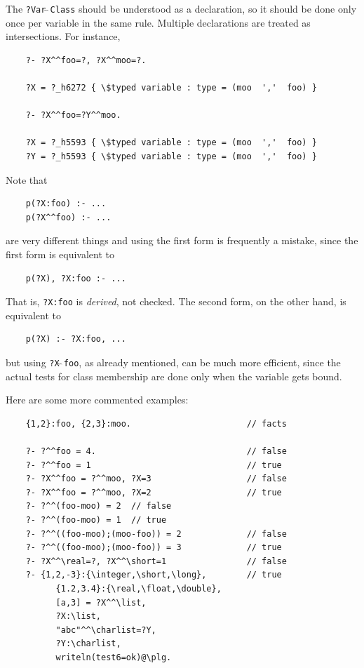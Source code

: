 \documentclass[11pt]{article}
\begin{document}
The \texttt{?Var$\hat{~}\hat{~}$Class} should be understood as a declaration,
so it should be done only once per variable in the same rule.
Multiple declarations are treated as intersections. For instance,
\begin{verbatim}
    ?- ?X^^foo=?, ?X^^moo=?.

    ?X = ?_h6272 { \$typed variable : type = (moo  ','  foo) } 

    ?- ?X^^foo=?Y^^moo.

    ?X = ?_h5593 { \$typed variable : type = (moo  ','  foo) } 
    ?Y = ?_h5593 { \$typed variable : type = (moo  ','  foo) } 
\end{verbatim}
Note that
\begin{verbatim}
    p(?X:foo) :- ...
    p(?X^^foo) :- ...
\end{verbatim}
are very different things and using the first form is frequently a mistake,
since the first form is equivalent to
\begin{verbatim}
    p(?X), ?X:foo :- ...
\end{verbatim}
That is, \texttt{?X:foo} is \emph{derived}, not checked. The second form,
on the other hand, is equivalent to
\begin{verbatim}
    p(?X) :- ?X:foo, ...
\end{verbatim}
but using \texttt{?X$\hat{~}\hat{~}$foo}, as already mentioned, can be much
more efficient, since the actual tests for class membership are done only
when the variable gets bound. 

Here are some more commented examples:
\begin{verbatim}
    {1,2}:foo, {2,3}:moo.                       // facts

    ?- ?^^foo = 4.                              // false
    ?- ?^^foo = 1                               // true
    ?- ?X^^foo = ?^^moo, ?X=3                   // false
    ?- ?X^^foo = ?^^moo, ?X=2                   // true
    ?- ?^^(foo-moo) = 2  // false
    ?- ?^^(foo-moo) = 1  // true
    ?- ?^^((foo-moo);(moo-foo)) = 2             // false
    ?- ?^^((foo-moo);(moo-foo)) = 3             // true
    ?- ?X^^\real=?, ?X^^\short=1                // false
    ?- {1,2,-3}:{\integer,\short,\long},        // true
          {1.2,3.4}:{\real,\float,\double},
          [a,3] = ?X^^\list,
          ?X:\list,
          "abc"^^\charlist=?Y,
          ?Y:\charlist,
          writeln(test6=ok)@\plg.
\end{verbatim}
\end{document}
